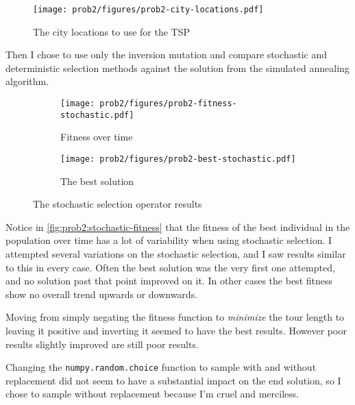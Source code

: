 \documentclass{article}
\begin{document}
\begin{figure}[h]
    \centering
    \texttt{[image: prob2/figures/prob2-city-locations.pdf]}
    \caption{The city locations to use for the TSP}\label{fig:prob2:city-locations}
\end{figure}

Then I chose to use only the inversion mutation and compare stochastic and deterministic selection
methods against the solution from the simulated annealing algorithm.

\begin{figure}[h]
    \centering
    \begin{subfigure}[b]{0.45\textwidth}
        \texttt{[image: prob2/figures/prob2-fitness-stochastic.pdf]}
        \caption{Fitness over time}\label{fig:prob2:stochastic-fitness}
    \end{subfigure}
    \begin{subfigure}[b]{0.45\textwidth}
        \texttt{[image: prob2/figures/prob2-best-stochastic.pdf]}
        \caption{The best solution}\label{fig:prob2:stochastic-best}
    \end{subfigure}
    \caption{The stochastic selection operator results}\label{fig:prob2:stochastic-selection}
\end{figure}

Notice in \autoref{fig:prob2:stochastic-fitness} that the fitness of the best individual in the
population over time has a lot of variability when using stochastic selection. I attempted several
variations on the stochastic selection, and I saw results similar to this in every case. Often the
best solution was the very first one attempted, and no solution past that point improved on it. In
other cases the best fitness show no overall trend upwards or downwards.

Moving from simply negating the fitness function to \textit{minimize} the tour length to leaving it
positive and inverting it seemed to have the best results. However poor results slightly improved
are still poor results.

Changing the \texttt{numpy.random.choice} function to sample with and without
replacement did not seem to have a substantial impact on the end solution, so I chose to sample
without replacement because I'm cruel and merciless.
\end{document}
